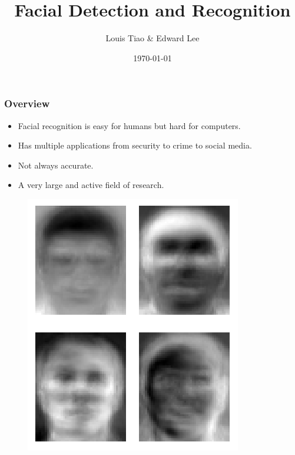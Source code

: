 \documentclass{beamer}
\title[Computer Vision]{Facial Detection and Recognition} %
\author{Louis Tiao \& Edward Lee} %
\institute[UNSW] %
{
School of Computer Science and Engineering, \\
The University of New South Wales \\ %
\medskip
}
\date{\today} %
\begin{document}
\maketitle

\begin{frame}[t]\frametitle{Overview}
\begin{itemize}
    \item Facial recognition is easy for humans but hard for computers.
    \item Has multiple applications from security to crime to social media.
    \item Not always accurate.
    \item A very large and active field of research.
\end{itemize}
    
\begin{minipage}[t]{0.45\linewidth}
    \begin{figure}
    \includegraphics[width=0.88\linewidth]{Eigenfaces.png}
    \end{figure}
\end{minipage}
\hfill%
\begin{minipage}[t]{0.45\linewidth}
        \begin{figure}

\end{figure}
\end{minipage}
\end{frame}
\end{document}
